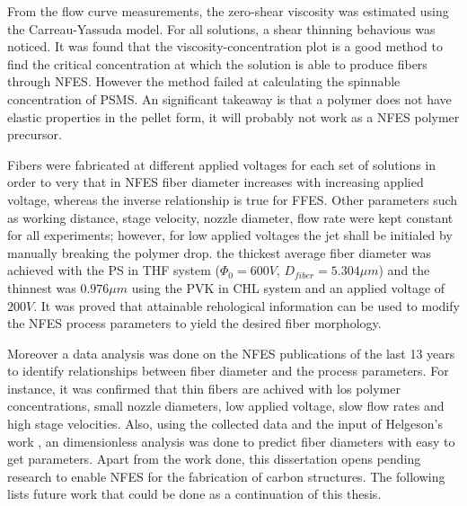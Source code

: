 From the flow curve measurements, the zero-shear viscosity was estimated using the Carreau-Yassuda model. For all solutions, a shear thinning behavious was noticed. It was found that the viscosity-concentration plot is a good method to find the critical concentration at which the solution is able to produce fibers through NFES. However the method failed at calculating the spinnable concentration of PSMS. An significant takeaway is that a polymer does not have elastic properties in the pellet form, it will probably not work as a NFES polymer precursor.

Fibers were fabricated at different applied voltages for each set of solutions in order to very that in NFES fiber diameter increases with increasing applied voltage, whereas the inverse relationship is true for FFES. Other parameters such as working distance, stage velocity, nozzle diameter, flow rate were kept constant for all experiments; however, for low applied voltages the jet shall be initialed by manually breaking the polymer drop. the thickest average fiber diameter was achieved with the PS in THF system ($\Phi_0 = 600 V$, $D_{fiber} = 5.304 \mu m$) and the thinnest was $0.976 \mu m$ using the PVK in CHL system and an applied voltage of $200 V$. It was proved that attainable rehological information can be used to modify the NFES process parameters to yield the desired fiber morphology.

Moreover a data analysis was done on the NFES publications of the last 13 years to identify relationships between fiber diameter and the process parameters. For instance, it was confirmed that thin fibers are achived with los polymer concentrations, small nozzle diameters, low applied voltage, slow flow rates and high stage velocities. Also, using the collected data and the input of Helgeson's work \cite{Helgeson2007}, an dimensionless analysis was done to predict fiber diameters with easy to get parameters. Apart from the work done, this dissertation opens pending research to enable NFES for the fabrication of carbon structures. The following lists future work that could be done as a continuation of this thesis.

